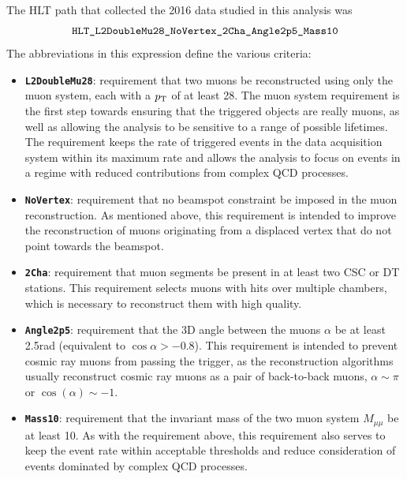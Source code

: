 The HLT path that collected the 2016 data studied in this analysis was
$$\texttt{HLT\_L2DoubleMu28\_NoVertex\_2Cha\_Angle2p5\_Mass10}$$
The abbreviations in this expression define the various criteria:
\begin{itemize}
  \item \texttt{\textbf{L2DoubleMu28}}: requirement that two muons be reconstructed using only the muon system, each with a $p_{\mathrm{T}}$ of at least 28\GeV. The muon system requirement is the first step towards ensuring that the triggered objects are really muons, as well as allowing the analysis to be sensitive to a range of possible lifetimes. The \pT requirement keeps the rate of triggered events in the data acquisition system within its maximum rate and allows the analysis to focus on events in a regime with reduced contributions from complex QCD processes.
  \item \texttt{\textbf{NoVertex}}: requirement that no beamspot constraint be imposed in the muon reconstruction. As mentioned above, this requirement is intended to improve the reconstruction of muons originating from a displaced vertex that do not point towards the beamspot.
  \item \texttt{\textbf{2Cha}}: requirement that muon segments be present in at least two CSC or DT stations. This requirement selects muons with hits over multiple chambers, which is necessary to reconstruct them with high quality.
  \item \texttt{\textbf{Angle2p5}}: requirement that the 3D angle between the muons $\alpha$ be at least 2.5\unit{rad} (equivalent to $\cos{\alpha} > -0.8$). This requirement is intended to prevent cosmic ray muons from passing the trigger, as the reconstruction algorithms usually reconstruct cosmic ray muons as a pair of back-to-back muons, \ie $\alpha \sim \pi$ or $\cos(\alpha) \sim -1$.
  \item \texttt{\textbf{Mass10}}: requirement that the invariant mass of the two muon system $M_{\mu\mu}$ be at least 10\GeV. As with the \pT requirement above, this requirement also serves to keep the event rate within acceptable thresholds and reduce consideration of events dominated by complex QCD processes.
\end{itemize}

